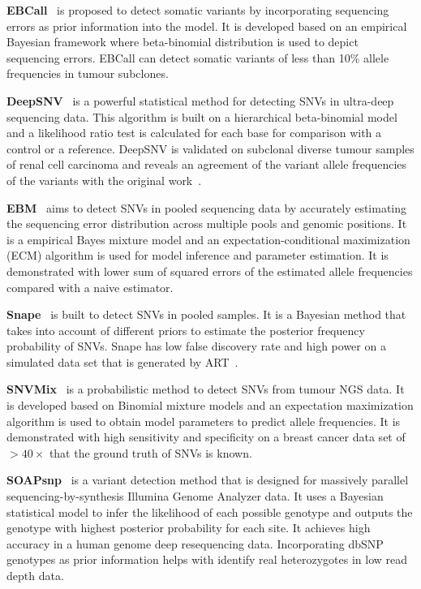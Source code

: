 \documentclass[a4,center,fleqn]{NAR}
\begin{document}
\textbf{EBCall}~\citep{Shiraishi2013} is proposed to detect somatic variants by incorporating sequencing errors as prior information into the model.
It is developed based on an empirical Bayesian framework where beta-binomial distribution is used to depict sequencing errors.
EBCall can detect somatic variants of less than 10\% allele frequencies in tumour subclones.

\textbf{DeepSNV}~\citep{gerstung2012reliable} is a powerful statistical method for detecting SNVs in ultra-deep sequencing data.
This algorithm is built on a hierarchical beta-binomial model and a likelihood ratio test is calculated for each base for comparison with a control or a reference.
DeepSNV is validated on subclonal diverse tumour samples of renal cell carcinoma and reveals an agreement of the variant allele frequencies of the variants with the original work~\citep{gerstung2012reliable}.

\textbf{EBM}~\citep{Zhou2012} aims to detect SNVs in pooled sequencing data by accurately estimating the sequencing error distribution across multiple pools and genomic positions. 
It is a empirical Bayes mixture model and an expectation-conditional maximization (ECM) algorithm is used for model inference and parameter estimation.
It is demonstrated with lower sum of squared errors of the estimated allele frequencies compared with a naive estimator.

\textbf{Snape}~\citep{Raineri2012} is built to detect SNVs in pooled samples.
It is a Bayesian method that takes into account of different priors to estimate the posterior frequency probability of SNVs.
Snape has low false discovery rate and high power on a simulated data set that is generated by ART~\citep{huang2012art}.

\textbf{SNVMix}~\citep{Goya2010} is a probabilistic method to detect SNVs from tumour NGS data.
It is developed based on Binomial mixture models and an expectation maximization algorithm is used to obtain model parameters to predict allele frequencies.
It is demonstrated with high sensitivity and specificity on a breast cancer data set of $> 40 \times$ that the ground truth of SNVs is known.

\textbf{SOAPsnp}~\citep{Li2009} is a variant detection method that is designed for massively parallel sequencing-by-synthesis Illumina Genome Analyzer data.
It uses a Bayesian statistical model to infer the likelihood of each possible genotype and outputs the genotype with highest posterior probability for each site.
It achieves high accuracy in a human genome deep resequencing data.
Incorporating dbSNP genotypes as prior information helps with identify real heterozygotes in low read depth data.
\end{document}

